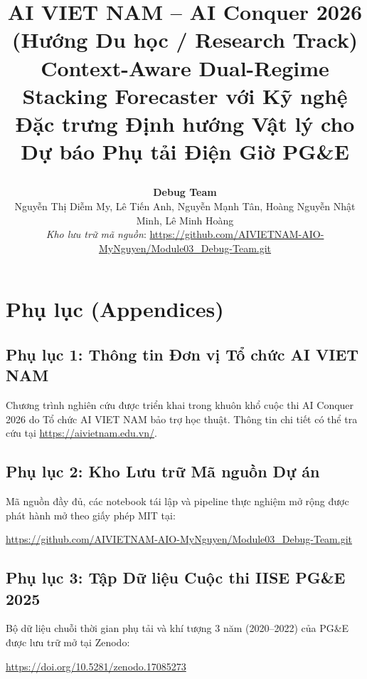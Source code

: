 \documentclass[12pt]{ai_conquer2026}
\title{%
  \begin{center}
        \Large {AI VIET NAM -- AI Conquer 2026 (Hướng Du học / Research Track)}\\[.5ex]  
        \Huge \textbf{Context-Aware Dual-Regime Stacking Forecaster với Kỹ nghệ Đặc trưng Định hướng Vật lý cho Dự báo Phụ tải Điện Giờ PG\&E}\\[.5ex]
  \end{center}
}
\author{
\begin{minipage}{\textwidth}
\centering
{
\vspace{-1.5em}
\textbf{Debug Team} \\
Nguyễn Thị Diễm My, Lê Tiến Anh, Nguyễn Mạnh Tân, Hoàng Nguyễn Nhật Minh, Lê Minh Hoàng \\
\textit{Kho lưu trữ mã nguồn}: \url{https://github.com/AIVIETNAM-AIO-MyNguyen/Module03_Debug-Team.git}
}
\end{minipage}
}
\date{}
\begin{document}
\maketitle



\newpage
\tableofcontents
\newpage













\newpage
\printbibliography[heading=bibintoc, title={Tài liệu tham khảo (References)}]

\newpage
\appendix
\section*{Phụ lục (Appendices)}

\subsection*{Phụ lục 1: Thông tin Đơn vị Tổ chức AI VIET NAM}
Chương trình nghiên cứu được triển khai trong khuôn khổ cuộc thi AI Conquer 2026 do Tổ chức AI VIET NAM bảo trợ học thuật. Thông tin chi tiết có thể tra cứu tại \url{https://aivietnam.edu.vn/}.

\subsection*{Phụ lục 2: Kho Lưu trữ Mã nguồn Dự án}
Mã nguồn đầy đủ, các notebook tái lập và pipeline thực nghiệm mở rộng được phát hành mở theo giấy phép MIT tại:
\begin{center}
    \url{https://github.com/AIVIETNAM-AIO-MyNguyen/Module03_Debug-Team.git}
\end{center}

\subsection*{Phụ lục 3: Tập Dữ liệu Cuộc thi IISE PG\&E 2025}
Bộ dữ liệu chuỗi thời gian phụ tải và khí tượng 3 năm (2020--2022) của PG\&E được lưu trữ mở tại Zenodo:
\begin{center}
    \url{https://doi.org/10.5281/zenodo.17085273}
\end{center}
\end{document}
